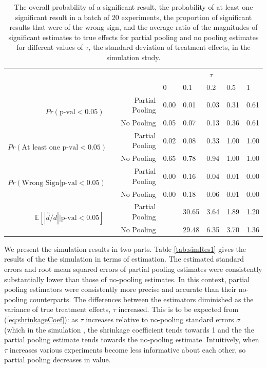 \documentclass{edm_template}
\newcommand{\EE}{\mathbb{E}}
\begin{document}
\begin{table}
\centering
\begin{tabular}{rrlllll}
&&\multicolumn{5}{c}{$\tau$}\\
&&0&0.1&0.2&0.5&1\\
\hline
\multirow{2}{*}{$Pr(\text{p-val}<0.05)$}& Partial Pooling & 0.00&0.01&0.03&0.31&0.61 \\ 
& No Pooling & 0.05&0.07&0.13&0.36&0.61 \\ 
\hline\multirow{2}{*}{$Pr(\text{At least one p-val}<0.05)$}& Partial Pooling & 0.02&0.08&0.33&1.00&1.00 \\ 
& No Pooling & 0.65&0.78&0.94&1.00&1.00 \\ 
\hline\multirow{2}{*}{ $Pr(\text{Wrong Sign}|\text{p-val}<0.05)$ }& Partial Pooling & 0.00&0.16&0.04&0.01&0.00 \\ 
& No Pooling & 0.00&0.18&0.06&0.01&0.00 \\ 
\hline\multirow{2}{*}{ $\EE\left[|\hat{d}/d||\text{p-val}<0.05\right]$ }& Partial Pooling &  &30.65&3.64&1.89&1.20 \\ 
& No Pooling &  &29.48&6.35&3.70&1.36 \\ 
\hline
\end{tabular}
\caption{The overall probability of a significant result, the probability of at least one significant result in a batch of 20 experiments, the proportion of significant results that were of the wrong sign, and the average ratio of the magnitudes of significant estimates to true effects for partial pooling and no pooling estimates for different values of $\tau$, the standard deviation of treatment effects, in the simulation study.}
\label{tab:simRes2}
\end{table}

We present the simulation results in two parts. 
Table \ref{tab:simRes1} gives the results of the the simulation in terms of estimation. 
The estimated standard errors and root mean squared errors of partial pooling estimates were consistently substantially lower than those of no-pooling estimates.
In this context, partial pooling estimators were consistently more precise and accurate than their no-pooling counterparts. 
The differences between the estimators diminished as the variance of true treatment effects, $\tau$ increased. 
This is to be expected from (\ref{eq:shrinkageCoef}): as $\tau$ increases relative to no-pooling standard errors $\sigma$ (which in the simulation , the shrinkage coefficient tends towards 1 and the the partial pooling estimate tends towards the no-pooling estimate.
Intuitively, when $\tau$ increases various experiments become less informative about each other, so partial pooling decreases in value. 
\end{document}
